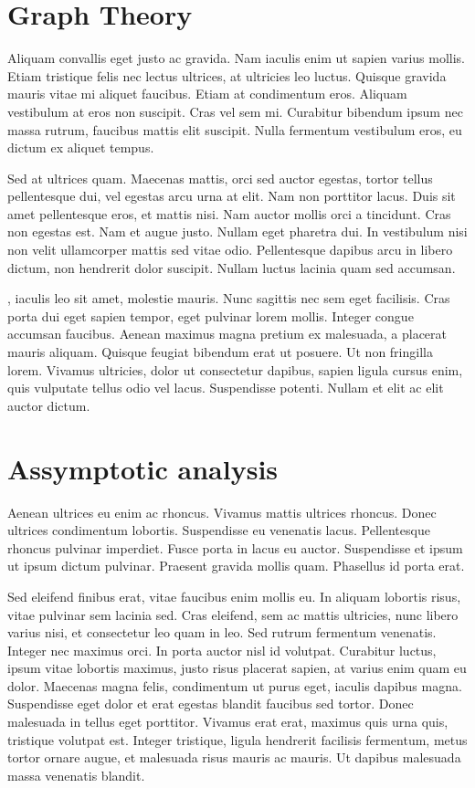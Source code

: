 \documentclass[a4paper, 12pt]{article}
\begin{document}
	\section{Graph Theory}
	Aliquam convallis eget justo ac gravida. Nam iaculis enim ut sapien varius mollis. Etiam tristique felis nec lectus ultrices, at ultricies leo luctus. Quisque gravida mauris vitae mi aliquet faucibus. Etiam at condimentum eros. Aliquam vestibulum at eros non suscipit. Cras vel sem mi. Curabitur bibendum ipsum nec massa rutrum, faucibus mattis elit suscipit. Nulla fermentum vestibulum eros, eu dictum ex aliquet tempus.
	
	Sed at ultrices quam. Maecenas mattis, orci sed auctor egestas, tortor tellus pellentesque dui, vel egestas arcu urna at elit. Nam non porttitor lacus. Duis sit amet pellentesque eros, et mattis nisi. Nam auctor mollis orci a tincidunt. Cras non egestas est. Nam et augue justo. Nullam eget pharetra dui. In vestibulum nisi non velit ullamcorper mattis sed vitae odio. Pellentesque dapibus arcu in libero dictum, non hendrerit dolor suscipit. Nullam luctus lacinia quam sed accumsan.
	
	, iaculis leo sit amet, molestie mauris. Nunc sagittis nec sem eget facilisis. Cras porta dui eget sapien tempor, eget pulvinar lorem mollis. Integer congue accumsan faucibus. Aenean maximus magna pretium ex malesuada, a placerat mauris aliquam. Quisque feugiat bibendum erat ut posuere. Ut non fringilla lorem. Vivamus ultricies, dolor ut consectetur dapibus, sapien ligula cursus enim, quis vulputate tellus odio vel lacus. Suspendisse potenti. Nullam et elit ac elit auctor dictum.
	
	\section[Algorithm Analysis]{Assymptotic analysis}
	Aenean ultrices eu enim ac rhoncus. Vivamus mattis ultrices rhoncus. Donec ultrices condimentum lobortis. Suspendisse eu venenatis lacus. Pellentesque rhoncus pulvinar imperdiet. Fusce porta in lacus eu auctor. Suspendisse et ipsum ut ipsum dictum pulvinar. Praesent gravida mollis quam. Phasellus id porta erat.
	
	Sed eleifend finibus erat, vitae faucibus enim mollis eu. In aliquam lobortis risus, vitae pulvinar sem lacinia sed. Cras eleifend, sem ac mattis ultricies, nunc libero varius nisi, et consectetur leo quam in leo. Sed rutrum fermentum venenatis. Integer nec maximus orci. In porta auctor nisl id volutpat. Curabitur luctus, ipsum vitae lobortis maximus, justo risus placerat sapien, at varius enim quam eu dolor. Maecenas magna felis, condimentum ut purus eget, iaculis dapibus magna. Suspendisse eget dolor et erat egestas blandit faucibus sed tortor. Donec malesuada in tellus eget porttitor. Vivamus erat erat, maximus quis urna quis, tristique volutpat est. Integer tristique, ligula hendrerit facilisis fermentum, metus tortor ornare augue, et malesuada risus mauris ac mauris. Ut dapibus malesuada massa venenatis blandit.
	
\end{document}
